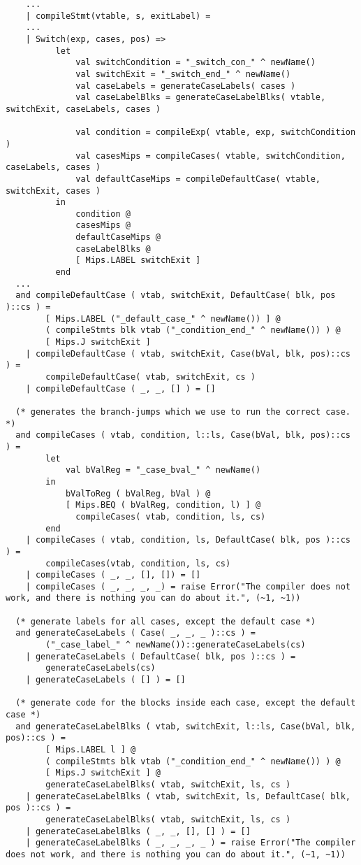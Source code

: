 \documentclass[12pt]{article}
\begin{document}
\begin{lstlisting}
    ...
    | compileStmt(vtable, s, exitLabel) =
    ...
    | Switch(exp, cases, pos) =>
          let 
              val switchCondition = "_switch_con_" ^ newName()
              val switchExit = "_switch_end_" ^ newName()
              val caseLabels = generateCaseLabels( cases )
              val caseLabelBlks = generateCaseLabelBlks( vtable, switchExit, caseLabels, cases )

              val condition = compileExp( vtable, exp, switchCondition )
              val casesMips = compileCases( vtable, switchCondition, caseLabels, cases )
              val defaultCaseMips = compileDefaultCase( vtable, switchExit, cases ) 
          in
              condition @
              casesMips @
              defaultCaseMips @
              caseLabelBlks @
              [ Mips.LABEL switchExit ]
          end
  ...
  and compileDefaultCase ( vtab, switchExit, DefaultCase( blk, pos )::cs ) =
        [ Mips.LABEL ("_default_case_" ^ newName()) ] @
        ( compileStmts blk vtab ("_condition_end_" ^ newName()) ) @
        [ Mips.J switchExit ] 
    | compileDefaultCase ( vtab, switchExit, Case(bVal, blk, pos)::cs ) =
        compileDefaultCase( vtab, switchExit, cs )
    | compileDefaultCase ( _, _, [] ) = []

  (* generates the branch-jumps which we use to run the correct case. *)
  and compileCases ( vtab, condition, l::ls, Case(bVal, blk, pos)::cs ) = 
        let 
            val bValReg = "_case_bval_" ^ newName()
        in 
            bValToReg ( bValReg, bVal ) @
            [ Mips.BEQ ( bValReg, condition, l) ] @ 
              compileCases( vtab, condition, ls, cs)
        end
    | compileCases ( vtab, condition, ls, DefaultCase( blk, pos )::cs ) =
        compileCases(vtab, condition, ls, cs)
    | compileCases ( _, _, [], []) = []
    | compileCases ( _, _, _, _) = raise Error("The compiler does not work, and there is nothing you can do about it.", (~1, ~1))

  (* generate labels for all cases, except the default case *)
  and generateCaseLabels ( Case( _, _, _ )::cs ) =
        ("_case_label_" ^ newName())::generateCaseLabels(cs)
    | generateCaseLabels ( DefaultCase( blk, pos )::cs ) =  
        generateCaseLabels(cs)
    | generateCaseLabels ( [] ) = []

  (* generate code for the blocks inside each case, except the default case *)
  and generateCaseLabelBlks ( vtab, switchExit, l::ls, Case(bVal, blk, pos)::cs ) =
        [ Mips.LABEL l ] @ 
        ( compileStmts blk vtab ("_condition_end_" ^ newName()) ) @ 
        [ Mips.J switchExit ] @ 
        generateCaseLabelBlks( vtab, switchExit, ls, cs )
    | generateCaseLabelBlks ( vtab, switchExit, ls, DefaultCase( blk, pos )::cs ) = 
        generateCaseLabelBlks( vtab, switchExit, ls, cs )
    | generateCaseLabelBlks ( _, _, [], [] ) = []
    | generateCaseLabelBlks ( _, _, _, _ ) = raise Error("The compiler does not work, and there is nothing you can do about it.", (~1, ~1))


\end{lstlisting}
\end{document}
